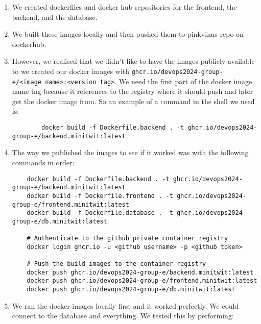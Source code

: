 \begin{enumerate}
    \item We created dockerfiles and docker hub repositories for the frontend, the backend, and the database.
    \item We built these images locally and then pushed them to pinkvinus repo on dockerhub.
    \item However, we realised that we didn't like to have the images publicly available to we created our docker images with \texttt{ghcr.io/devops2024-group-e/\textless{}image\ name\textgreater{}:\textless{}version\ tag\textgreater{}}. We need the first part of the docker image name tag because it references to the registry where it should push and later get the docker image from. So an example of a command in the shell we used is:
    \begin{verbatim}
        docker build -f Dockerfile.backend . -t ghcr.io/devops2024-group-e/backend.minitwit:latest
    \end{verbatim}
    \item The way we published the images to see if it worked was with the following commands in order:
\begin{verbatim}
    docker build -f Dockerfile.backend . -t ghcr.io/devops2024-group-e/backend.minitwit:latest
    docker build -f Dockerfile.frontend . -t ghcr.io/devops2024-group-e/frontend.minitwit:latest
    docker build -f Dockerfile.database . -t ghcr.io/devops2024-group-e/db.minitwit:latest

    # Authenticate to the github private container registry
    docker login ghcr.io -u <github username> -p <github token>

    # Push the build images to the container registry
    docker push ghcr.io/devops2024-group-e/backend.minitwit:latest
    docker push ghcr.io/devops2024-group-e/frontend.minitwit:latest
    docker push ghcr.io/devops2024-group-e/db.minitwit:latest
\end{verbatim}
    \item We ran the docker images locally first and it worked perfectly. We could connect to the database and everything. We tested this by performing:


\end{enumerate}

